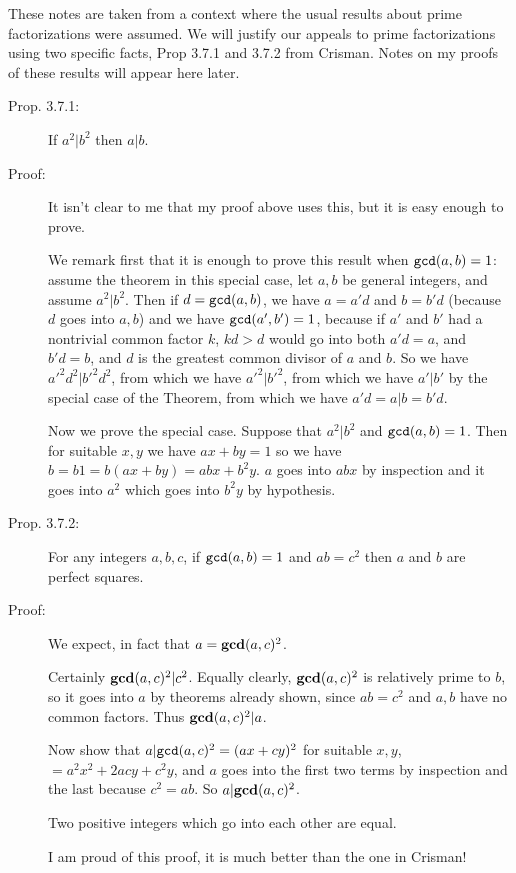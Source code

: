 \documentclass[12pt]{article}
\begin{document}
These notes are taken from a context where the usual results about prime factorizations were assumed.  We will justify our appeals
to prime factorizations using two specific facts, Prop 3.7.1 and 3.7.2 from Crisman.  Notes on my proofs of these results will appear
here later.

\begin{description}

\item[Prop. 3.7.1:]  If $a^2 | b^2$ then $a|b$.  

\item[Proof:]  It isn't clear to me that my proof above uses this, but it is easy enough to prove.

We remark first that it is enough to prove this result when ${\tt gcd}(a,b)=1$:  assume the theorem in this special case, let $a,b$ be general integers, and assume $a^2 | b^2$.  Then if $d={\tt gcd}(a,b)$, we have $a=a'd$ and $b=b'd$ (because $d$ goes into $a,b$) and we have ${\tt gcd}(a',b')=1$, because if $a'$ and $b'$ had a nontrivial common factor $k$, $kd>d$ would go into both $a'd=a$, and $b'd=b$, and $d$ is the greatest common divisor of $a$ and $b$.  So we have $a'^2d^2 | b'^2d^2$, from which we have $a'^2|b'^2$, from which we have $a'|b'$ by the special case of the Theorem, from which we have $a'd=a|b = b'd$.

Now we prove the special case.  Suppose that $a^2|b^2$ and ${\tt gcd}(a,b)=1$.  Then for suitable $x,y$ we have $ax+by=1$ so we have
$b = b1 = b(ax+by) = abx + b^2y$.  $a$ goes into $abx$ by inspection and it goes into $a^2$ which goes into $b^2y$ by hypothesis.

\item[Prop. 3.7.2:]  For any integers $a,b,c$, if ${\tt gcd}(a,b)=1$ and $ab=c^2$ then $a$ and $b$ are perfect squares.

\item[Proof:]  We expect, in fact that $a = {\bf gcd}(a,c)^2$.

Certainly ${\bf gcd}(a,c)^2 | c^2$.  Equally clearly, ${\bf gcd}(a,c)^2$ is relatively prime to $b$, so it goes into $a$ by theorems already shown, since $ab=c^2$ and $a,b$ have no common factors.  Thus ${\bf gcd}(a,c)^2 | a$.

Now show that $a|{\tt gcd}(a,c)^2=(ax+cy)^2$ for suitable $x,y$, $= a^2x^2 + 2acy +c^2y$, and $a$ goes into the first two terms by inspection and the last because $c^2=ab$.  So $a|{\bf gcd}(a,c)^2$.

Two positive integers which go into each other are equal.

I am proud of this proof, it is much better than the one in Crisman!

\end{description}
\end{document}
